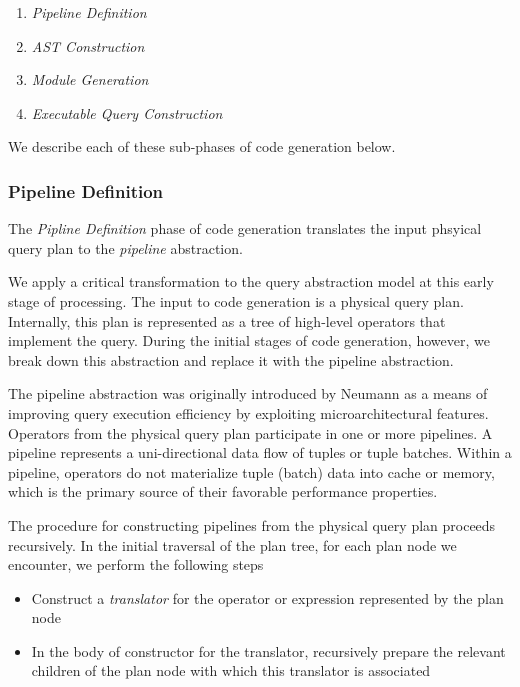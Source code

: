 \documentclass{vldb}
\begin{document}
\begin{enumerate}
    \item \textit{Pipeline Definition}
    \item \textit{AST Construction}
    \item \textit{Module Generation}
    \item \textit{Executable Query Construction}
\end{enumerate}

We describe each of these sub-phases of code generation below.

\subsubsection{Pipeline Definition}

The \textit{Pipline Definition} phase of code generation translates the input phsyical query plan to the \textit{pipeline} abstraction.

We apply a critical transformation to the query abstraction model at this early stage of processing. The input to code generation is a physical query plan. Internally, this plan is represented as a tree of high-level operators that implement the query. During the initial stages of code generation, however, we break down this abstraction and replace it with the pipeline abstraction.

The pipeline abstraction was originally introduced by Neumann \cite{neumann11} as a means of improving query execution efficiency by exploiting microarchitectural features. Operators from the physical query plan participate in one or more pipelines. A pipeline represents a uni-directional data flow of tuples or tuple batches. Within a pipeline, operators do not materialize tuple (batch) data into cache or memory, which is the primary source of their favorable performance properties.

The procedure for constructing pipelines from the physical query plan proceeds recursively. In the initial traversal of the plan tree, for each plan node we encounter, we perform the following steps
\begin{itemize}
    \item Construct a \textit{translator} for the operator or expression represented by the plan node
    \item In the body of constructor for the translator, recursively prepare the relevant children of the plan node with which this translator is associated
\end{itemize}
\end{document}
